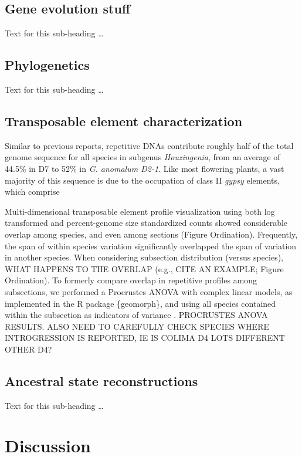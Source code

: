 \documentclass{bmcart}
\newcommand{\note}[2][]{\added[id=#1,remark={#2}]{}}
\begin{document}
\subsection*{Gene evolution stuff}
Text for this sub-heading \ldots

\subsection*{Phylogenetics}
Text for this sub-heading \ldots

\subsection*{Transposable element characterization}
Similar to previous reports, repetitive DNAs contribute roughly half of the total genome sequence for all species in subgenus \textit{Houzingenia}, from an average of 44.5\% in D7 to 52\% in \textit{G. anomalum D2-1}. Like most flowering plants, a vast majority of this sequence is due to the occupation of class II \textit{gypsy} elements, which comprise 

Multi-dimensional transposable element profile visualization using both log transformed and percent-genome size standardized counts showed considerable overlap among species, and even among sections (Figure Ordination). Frequently, the span of within species variation significantly overlapped the span of variation in another species. When considering subsection distribution (versus species), WHAT HAPPENS TO THE OVERLAP (e.g., CITE AN EXAMPLE; Figure Ordination).\note[Corrinne]{I need to draw the ellipses here and get estimates of variability described by each axis by PCA} To formerly compare overlap in repetitive profiles among subsections, we performed a Procrustes ANOVA with complex linear models, as implemented in the R package \{geomorph\}, and using all species contained within the subsection as indicators of variance \note[Corrinne]{will need to check the phylogeny to make sure all species end up in their assigned subsection before running this}. PROCRUSTES ANOVA RESULTS. ALSO NEED TO CAREFULLY CHECK SPECIES WHERE INTROGRESSION IS REPORTED, IE IS COLIMA D4 LOTS DIFFERENT OTHER D4?

\subsection*{Ancestral state reconstructions}
Text for this sub-heading \ldots

\section*{Discussion}
\end{document}
